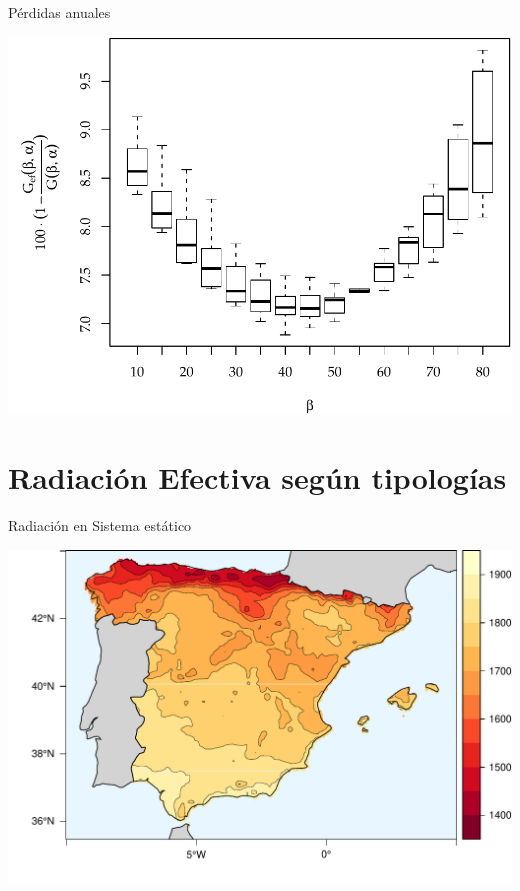 \documentclass[xcolor={usenames,svgnames,dvipsnames}]{beamer}
\begin{document}
\begin{frame}[label={sec:org0daf67a}]{Pérdidas anuales}
\begin{center}
\includegraphics[width=.9\linewidth]{../figs/GefVSG.pdf}
\end{center}
\end{frame}

\section{Radiación Efectiva según tipologías}
\label{sec:org348997f}



\begin{frame}[label={sec:org0bd15f3}]{Radiación en Sistema estático}
\begin{center}
\includegraphics[width=.9\linewidth]{../figs/FixedKrig.pdf}
\end{center}
\end{frame}
\end{document}
